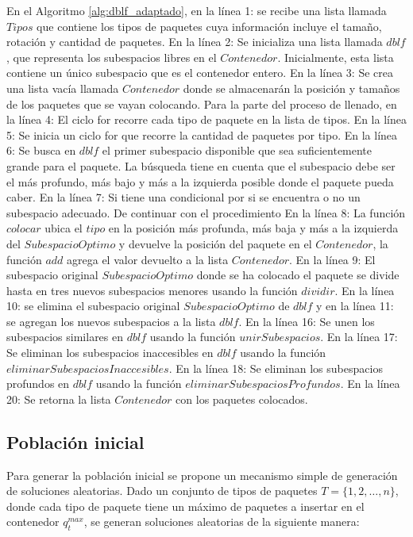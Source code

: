 \documentclass[openany]{article}
\begin{document}
En el Algoritmo \ref{alg:dblf_adaptado}, en la línea 1: se recibe una lista llamada $Tipos$ que contiene los tipos de paquetes cuya información incluye el tamaño, rotación y cantidad de paquetes. En la línea 2: Se inicializa una lista llamada $dblf$, que representa los subespacios libres en el $Contenedor$. Inicialmente, esta lista contiene un único subespacio que es el contenedor entero. En la línea 3: Se crea una lista vacía llamada $Contenedor$ donde se almacenarán la posición y tamaños de los paquetes que se vayan colocando. Para la parte del proceso de llenado, en la línea 4: El ciclo for recorre cada tipo de paquete en la lista de tipos. En la línea 5: Se inicia un ciclo for que recorre la cantidad de paquetes por tipo. En la línea 6: Se busca en $dblf$ el primer subespacio disponible que sea suficientemente grande para el paquete. La búsqueda tiene en cuenta que el subespacio debe ser el más profundo, más bajo y más a la izquierda posible donde el paquete pueda caber. En la línea 7: Si tiene una condicional por si se encuentra o no un subespacio adecuado. De continuar con el procedimiento En la línea 8: La función $colocar$ ubica el $tipo$ en la posición más profunda, más baja y más a la izquierda del $SubespacioOptimo$ y devuelve la posición del paquete en el $Contenedor$, la función $add$ agrega el valor devuelto a la lista $Contenedor$. En la línea 9: El subespacio original $SubespacioOptimo$ donde se ha colocado el paquete se divide hasta en tres nuevos subespacios menores usando la función $dividir$. En la línea 10: se elimina el subespacio original $SubespacioOptimo$ de $dblf$ y en la línea 11: se agregan los nuevos subespacios a la lista $dblf$. En la línea 16: Se unen los subespacios similares en $dblf$ usando la función $unirSubespacios$. En la línea 17: Se eliminan los subespacios inaccesibles en $dblf$ usando la función $eliminarSubespaciosInaccesibles$. En la línea 18: Se eliminan los subespacios profundos en $dblf$ usando la función $eliminarSubespaciosProfundos$. En la línea 20: Se retorna la lista $Contenedor$ con los paquetes colocados.


\subsection{Población inicial}

Para generar la población inicial se propone un mecanismo simple de generación de soluciones aleatorias. Dado un conjunto de tipos de paquetes $T = \{1, 2, \ldots, n\}$, donde cada tipo de paquete tiene un máximo de paquetes a insertar en el contenedor $q^{max}_t$, se generan soluciones aleatorias de la siguiente manera:
\end{document}
